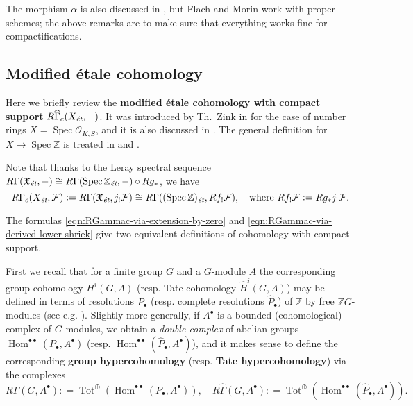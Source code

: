\documentclass{article}
\DeclareMathOperator{\Hom}{Hom}
\DeclareMathOperator{\Spec}{Spec}
\DeclareMathOperator{\Tot}{Tot}
\newcommand{\ZZ}{\mathbb{Z}}
\newcommand{\et}{\text{\it ét}}
\newcommand{\dfn}{\mathrel{\mathop:}=}
\theoremstyle{definition}
\numberwithin{equation}{section}
\begin{document}
\begin{appendices}
The morphism $\alpha$ is also discussed in \cite[Appendix~A]{Flach-Morin-2018},
but Flach and Morin work with proper schemes; the above remarks are to make sure
that everything works fine for compactifications.

\subsection*{Modified étale cohomology}

Here we briefly review the
\textbf{modified étale cohomology with compact support}
$R\widehat{\Gamma}_c (X_\et, -)$. It was introduced by Th.~Zink in
\cite[Appendix~2]{Haberland-1978} for the case of number rings
$X = \Spec \mathcal{O}_{K,S}$, and it is also discussed in
\cite[\S II.2]{Milne-ADT}. The general definition for $X \to \Spec\ZZ$
is treated in \cite[\S 6.7]{Flach-Morin-2018} and
\cite[\S 2]{Geisser-Schmidt-2018}.

Note that thanks to the Leray spectral sequence
$R\Gamma (\mathfrak{X}_\et, -) \cong R\Gamma (\Spec \ZZ_\et, -)\circ R g_*$,
we have
\begin{equation}
  \label{eqn:RGammac-via-derived-lower-shriek}
  R\Gamma_c (X_\et, \mathcal{F}) \dfn R\Gamma (\mathfrak{X}_\et, j_!\mathcal{F})
  \cong R\Gamma ((\Spec \ZZ)_\et, R f_! \mathcal{F}), \quad
  \text{where } Rf_! \mathcal{F} \dfn R g_* j_! \mathcal{F}.
\end{equation}

The formulas \eqref{eqn:RGammac-via-extension-by-zero} and
\eqref{eqn:RGammac-via-derived-lower-shriek} give two equivalent definitions of
cohomology with compact support.

First we recall that for a finite group $G$ and a $G$-module $A$ the
corresponding group cohomology $H^i (G,A)$ (resp. Tate cohomology
$\widehat{H}^i (G,A)$) may be defined in terms of resolutions $P_\bullet$
(resp. complete resolutions $\widehat{P}_\bullet$) of $\ZZ$ by free
$\ZZ G$-modules (see e.g. \cite[Chapter~VI]{Brown-1994}). Slightly more
generally, if $A^\bullet$ is a bounded (cohomological) complex of
$G$-modules, we obtain a \emph{double complex} of abelian groups
$\Hom^{\bullet\bullet} (P_\bullet, A^\bullet)$ (resp.  $\Hom^{\bullet\bullet}
(\widehat{P}_\bullet, A^\bullet)$), and it makes sense to define the
corresponding \textbf{group hypercohomology}
(resp. \textbf{Tate hypercohomology}) via the complexes
\[ R\Gamma (G, A^\bullet) \dfn
\Tot^\oplus (\Hom^{\bullet\bullet} (P_\bullet, A^\bullet)), \quad
R\widehat{\Gamma} (G, A^\bullet) \dfn
\Tot^\oplus (\Hom^{\bullet\bullet} (\widehat{P}_\bullet, A^\bullet)). \]


\end{appendices}
\end{document}
